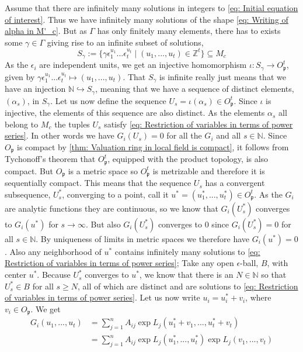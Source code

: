 \documentclass{article}
\newcommand{\mfrak}[1]{\mathfrak{#1}}
\newcommand{\mbb}[1]{\mathbb{#1}}
\numberwithin{equation}{section}
\begin{document}
Assume that there are infinitely many solutions in integers to \cref{eq: Initial equation of interest}. Thus we have infinitely many solutions of the shape \cref{eq: Writing of alpha in M'_c}. But as $\Gamma$ has only finitely many elements, there has to exists some $\gamma \in \Gamma$ giving rise to an infinite subset of solutions,
$$S_\gamma := \{\gamma \epsilon_1^{u_1} ... \epsilon_t^{u_t} \mid (u_1, ..., u_t) \in \mbb Z^t \} \subseteq M_c$$
As the $\epsilon_i$ are independent units, we get an injective homomorphism $\iota : S_\gamma \to O_\mfrak p^t$, given by $\gamma \epsilon_1^{u_1} ... \epsilon_t^{u_t} \mapsto (u_1, ..., u_t)$. That $S_\gamma$ is infinite really just means that we have an injection $\mbb N \hookrightarrow S_\gamma$, meaning that we have a sequence of distinct elements, $(\alpha_s)$, in $S_\gamma$. Let us now define the sequence $U_s = \iota(\alpha_s) \in O_\mfrak p^t$. Since $\iota$ is injective, the elements of this sequence are also distinct. As the elements $\alpha_s$ all belong to $M_c$ the tuples $U_s$ satisfy \cref{eq: Restriction of variables in terms of power series}. In other words we have $G_i(U_s) = 0$ for all the $G_i$ and all $s \in \mbb N$. Since $O_\mfrak p$ is compact by \cref{thm: Valuation ring in local field is compact}, it follows from Tychonoff's theorem that $O_\mfrak p^t$, equipped with the product topology, is also compact. But $O_\mfrak p$ is a metric space so $O_\mfrak p^t$ is metrizable and therefore it is sequentially compact. This means that the sequence $U_s$ has a convergent subsequence, $U^*_s$, converging to a point, call it $u^* = (u_1^*, ..., u_t^*) \in O_{\mfrak p}^t$. As the $G_i$ are analytic functions they are continuous, so we know that $G_i(U^*_s)$ converges to $G_i(u^*)$ for $s \to \infty$. But also $G_i(U^*_s)$ converges to 0 since $G_i(U^*_s) = 0$ for all $s \in \mbb N$. By uniqueness of limits in metric spaces we therefore have $G_i(u^*) = 0$. Also any neighborhood of $u^*$ contains infinitely many solutions to \cref{eq: Restriction of variables in terms of power series}; Take any open $\epsilon$-ball, $B$, with center $u^*$. Because $U^*_s$ converges to $u^*$, we know that there is an $N \in \mbb N$ so that $U^*_s \in B$ for all $s \geq N$, all of which are distinct and are solutions to \cref{eq: Restriction of variables in terms of power series}. Let us now write $u_i = u_i^* + v_i$, where $v_i \in O_\mfrak p$. We get
\begin{align*}
    G_i(u_1, ..., u_t) & = \sum_{j = 1}^n A_{ij} \exp L_j(u_1^* + v_1, ..., u_t^* + v_t)             \\
                       & = \sum_{j = 1}^n A_{ij} \exp L_j(u_1^*, ..., u_t^*) \exp L_j(v_1, ..., v_t)
\end{align*}
\end{document}
